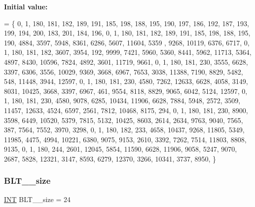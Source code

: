 {\bfseries Initial value\+:}
\begin{DoxyCode}
= \{
    0, 1, 180, 181, 182, 189, 191, 185, 198, 188, 195, 190, 197, 186, 192, 187, 193, 199, 194, 200, 183, 
      201, 184, 196, 
    0, 1, 180, 181, 182, 189, 191, 185, 198, 188, 195, 190, 4884, 3597, 5948, 8361, 6286, 5607, 11604, 5359
      , 9268, 10119, 6376, 6717, 
    0, 1, 180, 181, 182, 3607, 3954, 192, 9999, 7421, 5960, 5360, 8441, 5962, 11713, 5364, 4897, 8430, 
      10596, 7824, 4892, 3601, 11719, 9661, 
    0, 1, 180, 181, 230, 3555, 6628, 3397, 6306, 3556, 10029, 9369, 3668, 6967, 7653, 3038, 11388, 7190, 
      8829, 5482, 548, 11448, 3944, 12597, 
    0, 1, 180, 181, 230, 4580, 7262, 12633, 6628, 4058, 3149, 8031, 10425, 3668, 3397, 6967, 461, 9554, 
      8118, 8829, 9065, 6042, 5124, 12597, 
    0, 1, 180, 181, 230, 4580, 9078, 6285, 10434, 11906, 6628, 7884, 5948, 2572, 3509, 11457, 12633, 4524, 
      6597, 2561, 7812, 10468, 8175, 294, 
    0, 1, 180, 181, 230, 8900, 3598, 6449, 10520, 5379, 7815, 5132, 10425, 8603, 2614, 2634, 9763, 9040, 
      7565, 387, 7564, 7552, 3970, 3298, 
    0, 1, 180, 182, 233, 4658, 10437, 9268, 11805, 5349, 11985, 4475, 4994, 10221, 6380, 9075, 9153, 2610, 
      3392, 7262, 7514, 11803, 8808, 9135, 
    0, 1, 180, 244, 2601, 12045, 5854, 11590, 6628, 11906, 9058, 5247, 9070, 2687, 5828, 12321, 3147, 8593,
       6279, 12370, 3266, 10341, 3737, 8950, 
\}
\end{DoxyCode}
\mbox{\label{data___b_l_t_8_c_a6a60e513ddcad9493bb0407c428baa1d}} 
\subsubsection{\texorpdfstring{B\+L\+T\+\_\+\_\+size}{BLT\_23\_size}}
{\footnotesize\ttfamily \mbox{\hyperlink{galois_8h_a09fddde158a3a20bd2dcadb609de11dc}{I\+NT}} B\+L\+T\+\_\+\_\+size = 24}

\mbox{\label{data___b_l_t_8_c_ac2a3922b7e838deba9370803a97f5c81}} 
